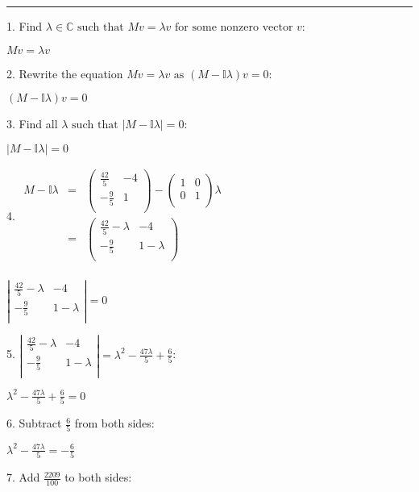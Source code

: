 \documentclass{article}
\begin{document}
\hrule

1. Find $\lambda \in \mathbb{C}\text{ such that }M v=\lambda  v\text{ for some nonzero vector }v:$

$M v=\lambda  v$

2. Rewrite the equation $M v=\lambda  v\text{ as }(M-\mathbb{I} \lambda ) v=0:$

$(M-\mathbb{I} \lambda ) v=0$

3. Find all $\lambda\text{  such that }| M-\mathbb{I} \lambda | =0:$

$| M-\mathbb{I} \lambda | =0$

4. $\begin{array}{lll}
M-\mathbb{I} \lambda  & = & \left(
\begin{array}{cc}
\frac{42}{5} & -4 \\
 -\frac{9}{5} & 1 \\
\end{array}
\right)-\left(
\begin{array}{cc}
1 & 0 \\
 0 & 1 \\
\end{array}
\right) \lambda  \\
\text{  }& = & \left(
\begin{array}{cc}
\frac{42}{5}-\lambda  & -4 \\
 -\frac{9}{5} & 1-\lambda  \\
\end{array}
\right) \\
\end{array}$

$\left| 
\begin{array}{cc}
\frac{42}{5}-\lambda  & -4 \\
 -\frac{9}{5} & 1-\lambda  \\
\end{array}
\right| =0$

5. $\left| 
\begin{array}{cc}
\frac{42}{5}-\lambda  & -4 \\
 -\frac{9}{5} & 1-\lambda  \\
\end{array}
\right| =\lambda ^2-\frac{47 \lambda }{5}+\frac{6}{5}$:

$\lambda ^2-\frac{47 \lambda }{5}+\frac{6}{5}=0$

6. Subtract $\frac{6}{5}$ from both sides:

$\lambda ^2-\frac{47 \lambda }{5}=-\frac{6}{5}$

7. Add $\frac{2209}{100}$ to both sides:
\end{document}
